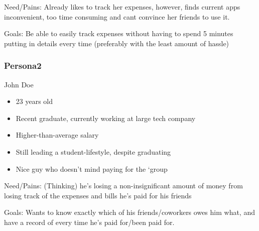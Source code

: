 \documentclass[a4wide, 11pt]{article}
\begin{document}
Need/Pains: Already likes to track her expenses, however, finds current apps inconvenient, too time consuming and cant convince her friends to use it.

Goals: Be able to easily track expenses without having to spend 5 minutes putting in details every time (preferably with the least amount of hassle)


\subsubsection{Persona2}
John Doe

\begin{itemize}
  \item 23 years old
  \item Recent graduate, currently working at large tech company
  \item Higher-than-average salary
  \item Still leading a student-lifestyle, despite graduating
  \item Nice guy who doesn’t mind paying for the `group
\end{itemize}

Need/Pains:
(Thinking) he’s losing a non-insignificant amount of money from losing track of the expenses and bills he’s paid for his friends

Goals: 
Wants to know exactly which of his friends/coworkers owes him what, and have a record of every time he’s paid for/been paid for.
\end{document}
